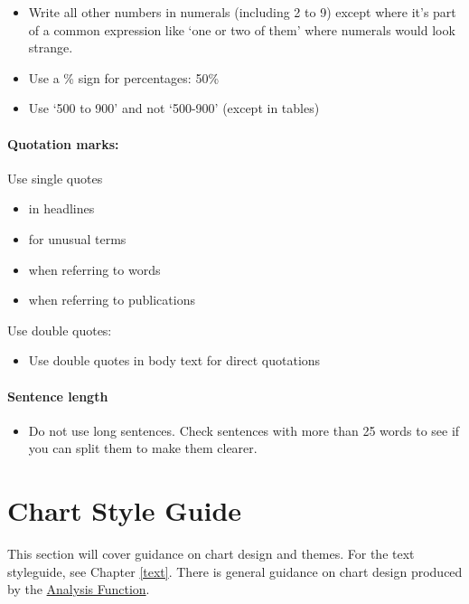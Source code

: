 \documentclass[
]{book}
\providecommand{\tightlist}{%
  \setlength{\itemsep}{0pt}\setlength{\parskip}{0pt}}
\begin{document}
\begin{itemize}
\tightlist
\item
  Write all other numbers in numerals (including 2 to 9) except where it's part of a common expression like `one or two of them' where numerals would look strange.
\item
  Use a \% sign for percentages: 50\%
\item
  Use `500 to 900' and not `500-900' (except in tables)
\end{itemize}

\hypertarget{quotation-marks}{%
\subsubsection{Quotation marks:}\label{quotation-marks}}

Use single quotes

\begin{itemize}
\tightlist
\item
  in headlines
\item
  for unusual terms
\item
  when referring to words
\item
  when referring to publications
\end{itemize}

Use double quotes:

\begin{itemize}
\tightlist
\item
  Use double quotes in body text for direct quotations
\end{itemize}

\hypertarget{sentence-length}{%
\subsubsection{Sentence length}\label{sentence-length}}

\begin{itemize}
\tightlist
\item
  Do not use long sentences. Check sentences with more than 25 words to see if you can split them to make them clearer.
\end{itemize}

\hypertarget{chart}{%
\chapter{Chart Style Guide}\label{chart}}

This section will cover guidance on chart design and themes. For the text
styleguide, see Chapter \ref{text}. There is general guidance on chart design
produced by the \href{https://analysisfunction.civilservice.gov.uk/policy-store/data-visualisation-charts/}{Analysis Function}.
\end{document}
